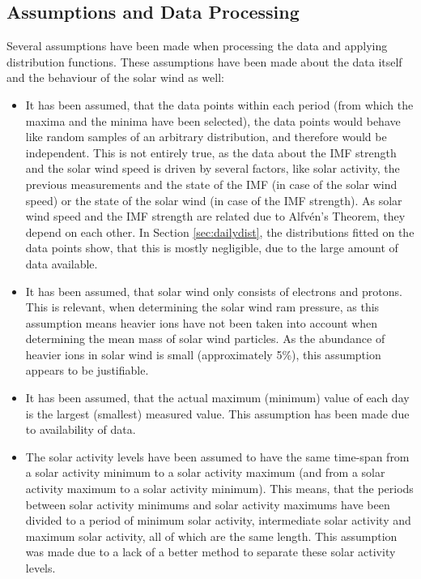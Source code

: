 \documentclass[11pt]{article}
\begin{document}
    \subsection{Assumptions and Data Processing}\label{sec:dataproc}
        Several assumptions have been made when processing the data and applying distribution functions. These assumptions have been made about the data itself and the behaviour of the solar wind as well:
        \begin{itemize}
            \item It has been assumed, that the data points within each period (from which the maxima and the minima have been selected), the data points would behave like random samples of an arbitrary distribution, and therefore would be independent. This is not entirely true, as the data about the IMF strength and the solar wind speed is driven by several factors, like solar activity, the previous measurements and the state of the IMF (in case of the solar wind speed) or the state of the solar wind (in case of the IMF strength). As solar wind speed and the IMF strength are related due to Alfvén's Theorem\cite{1976alfven}, they depend on each other. In Section \ref{sec:dailydist}, the distributions fitted on the data points show, that this is mostly negligible, due to the large amount of data available.
            \item It has been assumed, that solar wind only consists of electrons and protons. This is relevant, when determining the solar wind ram pressure, as this assumption means heavier ions have not been taken into account when determining the mean mass of solar wind particles. As the abundance of heavier ions in solar wind is small (approximately 5\%\cite{2006schwenn}), this assumption appears to be justifiable.
            \item It has been assumed, that the actual maximum (minimum) value of each day is the largest (smallest) measured value. This assumption has been made due to availability of data.
            \item The solar activity levels have been assumed to have the same time-span from a solar activity minimum to a solar activity maximum (and from a solar activity maximum to a solar activity minimum). This means, that the periods between solar activity minimums and solar activity maximums have been divided to a period of minimum solar activity, intermediate solar activity and maximum solar activity, all of which are the same length. This assumption was made due to a lack of a better method to separate these solar activity levels.
        \end{itemize}\\
\end{document}
